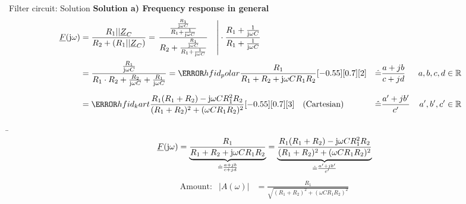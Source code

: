 %
\begin{frame}[allowframebreaks]%
\begin{expl}{Filter circuit: Solution}{}%
\textbf{Solution a) Frequency response in general}
    \begin{align*}
        \underline{F}(\mathrm{j}\omega) &= \frac{R_1 || \underline{Z}_C}{R_2 + ( R_1 || \underline{Z}_C)} 
        = \left.\frac{\frac{\frac{R_1}{\mathrm{j}\omega C}}{R_1 + \frac{1}{\mathrm{j}\omega C}}}{
            R_2 + \frac{\frac{R_1}{\mathrm{j}\omega C}}{R_1 + \frac{1}{\mathrm{j}\omega C}}}\quad \right| 
            \cdot \frac{R_1 + \frac{1}{\mathrm{j}\omega C}}{R_1 + \frac{1}{\mathrm{j}\omega C}}
        \\[+2pt]
        &= \frac{\frac{R_1}{\mathrm{j}\omega C}}{R_1\cdot R_2 + \frac{R_2}{\mathrm{j}\omega C}+\frac{R_1}{\mathrm{j}\omega C}}
	    = \highlight{hfid_polar}{\frac{R_1}{R_1+R_2+\mathrm{j}\omega CR_1R_2}}[\hfofflowerb][\hfoffupperb][2]
            &&\hat{=}{} \frac{a+jb}{c+jd} 
            & a,b,c,d &\in \mathbb{R}
        \\[+6pt]
        &= \highlight{hfid_kart}{\frac{R_1(R_1+R_2)-\mathrm{j}\omega CR_1^2R_2}{(R_1+R_2)^2+(\omega CR_1R_2)^2}}[\hfofflowerb][\hfoffupperb][3]
        \quad\text{(Cartesian)}
            &&\hat{=}{} \frac{a'+jb'}{c'}
            & a',b',c' &\in \mathbb{R}
    \end{align*}\vspace{-15pt}%
\b{\framebreak}%
\b{%
\begin{equation*}
    \underline{F}(\mathrm{j}\omega) 
    = 
    \underbrace{
        \frac{R_1}{R_1+R_2+\mathrm{j}\omega CR_1R_2}
    }_{\mathrel{
        \hat{=}{} \frac{a+jb}{c+jd}
    }}%
    = 
    \underbrace{%
        \frac{R_1(R_1+R_2)-\mathrm{j}\omega CR_1^2R_2}{(R_1+R_2)^2+(\omega CR_1R_2)^2}
    }_{\mathrel{
        \hat{=}{} \frac{a'+jb'}{c'}
    }}%
\end{equation*}%
}%
    \begin{align*}
        &\text{Amount:}&
            |A(\omega)| &= \frac{R_1}{\sqrt{(R_1+R_2)^2+(\omega CR_1R_2)^2}}&

\end{align*}
\end{expl}
\end{frame}
